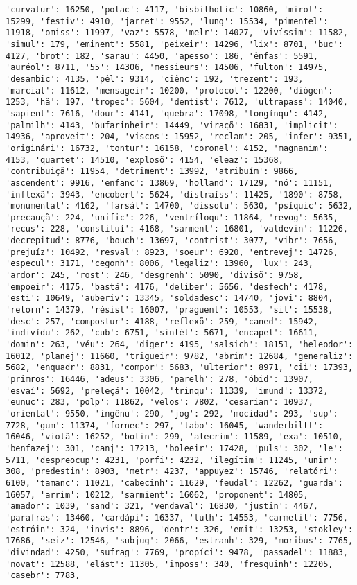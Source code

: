 \begin{Verbatim}[commandchars=\\\{\}]
'curvatur': 16250, 'polac': 4117, 'bisbilhotic': 10860, 'mirol': 15299, 'festiv': 4910, 'jarret': 9552, 'lung': 15534, 'pimentel': 11918, 'omiss': 11997, 'vaz': 5578, 'melr': 14027, 'vivíssim': 11582, 'simul': 179, 'eminent': 5581, 'peixeir': 14296, 'lix': 8701, 'buc': 4127, 'brot': 182, 'sarau': 4450, 'apesso': 186, 'ênfas': 5591, 'auréol': 8711, '55': 14306, 'messieurs': 14506, 'fulton': 14975, 'desambic': 4135, 'pêl': 9314, 'ciênc': 192, 'trezent': 193, 'marcial': 11612, 'mensageir': 10200, 'protocol': 12200, 'diógen': 1253, 'hã': 197, 'tropec': 5604, 'dentist': 7612, 'ultrapass': 14040, 'sapient': 7616, 'dour': 4141, 'quebra': 17098, 'longínqu': 4142, 'palmilh': 4143, 'bufarinheir': 14449, 'viraçõ': 16831, 'implicit': 14936, 'aproveit': 204, 'viscos': 15952, 'reclam': 205, 'infer': 9351, 'originári': 16732, 'tontur': 16158, 'coronel': 4152, 'magnanim': 4153, 'quartet': 14510, 'explosõ': 4154, 'eleaz': 15368, 'contribuiçã': 11954, 'detriment': 13992, 'atribuím': 9866, 'ascendent': 9916, 'enfanc': 13869, 'holland': 17129, 'nó': 11151, 'inflexã': 3943, 'encobert': 5624, 'distraíss': 11425, '1890': 8758, 'monumental': 4162, 'farsál': 14700, 'dissolu': 5630, 'psíquic': 5632, 'precauçã': 224, 'unific': 226, 'ventríloqu': 11864, 'revog': 5635, 'recus': 228, 'constituí': 4168, 'sarment': 16801, 'valdevin': 11226, 'decrepitud': 8776, 'bouch': 13697, 'contrist': 3077, 'vibr': 7656, 'prejuíz': 10492, 'resval': 8923, 'soeur': 6920, 'entrevej': 14726, 'especul': 3171, 'cegonh': 8006, 'legaliz': 13960, 'lux': 243, 'ardor': 245, 'rost': 246, 'desgrenh': 5090, 'divisõ': 9758, 'empoeir': 4175, 'bastã': 4176, 'deliber': 5656, 'desfech': 4178, 'esti': 10649, 'auberiv': 13345, 'soldadesc': 14740, 'jovi': 8804, 'retorn': 14379, 'résist': 16007, 'praguent': 10553, 'sil': 15538, 'desc': 257, 'compostur': 4188, 'reflexõ': 259, 'caned': 15942, 'indivídu': 262, 'cub': 6751, 'sintét': 5671, 'encapel': 16611, 'domin': 263, 'véu': 264, 'diger': 4195, 'salsich': 18151, 'heleodor': 16012, 'planej': 11660, 'trigueir': 9782, 'abrim': 12684, 'generaliz': 5682, 'enquadr': 8831, 'compor': 5683, 'ulterior': 8971, 'cii': 17393, 'primros': 16446, 'adeus': 3306, 'parelh': 278, 'óbid': 13907, 'esvaí': 5692, 'preleçã': 10042, 'trinqu': 11339, 'imund': 13372, 'eunuc': 283, 'polp': 11862, 'velos': 7802, 'cesarian': 10937, 'oriental': 9550, 'ingênu': 290, 'jog': 292, 'mocidad': 293, 'sup': 7728, 'gum': 11374, 'fornec': 297, 'tabo': 16045, 'wanderbiltt': 16046, 'violã': 16252, 'botin': 299, 'alecrim': 11589, 'exa': 10510, 'benfazej': 301, 'canj': 17213, 'boleeir': 17428, 'puls': 302, 'le': 5711, 'despreocup': 4231, 'porfi': 4232, 'ilegítim': 11245, 'unir': 308, 'predestin': 8903, 'metr': 4237, 'appuyez': 15746, 'relatóri': 6100, 'tamanc': 11021, 'cabecinh': 11629, 'feudal': 12262, 'guarda': 16057, 'arrim': 10212, 'sarmient': 16062, 'proponent': 14805, 'amador': 1039, 'sand': 321, 'vendaval': 16830, 'justin': 4467, 'parafras': 13460, 'cardápi': 16337, 'tulh': 14553, 'carmelit': 7756, 'estróin': 324, 'invis': 8896, 'dentr': 326, 'emit': 13253, 'stokley': 17686, 'seiz': 12546, 'subjug': 2066, 'estranh': 329, 'moribus': 7765, 'divindad': 4250, 'sufrag': 7769, 'propíci': 9478, 'passadel': 11883, 'novat': 12588, 'elást': 11305, 'imposs': 340, 'fresquinh': 12205, 'casebr': 7783, 
\end{Verbatim}

